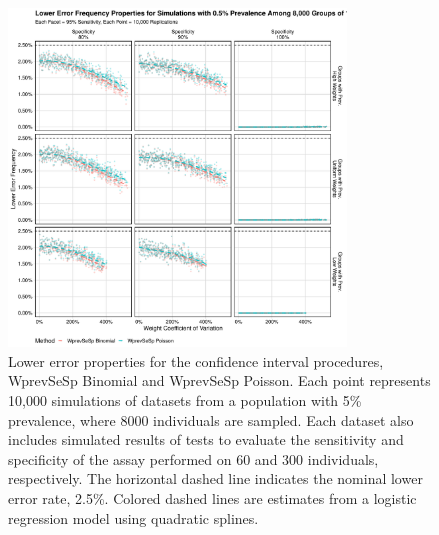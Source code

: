 \begin{figure}
\centering
\includegraphics[width=0.8\textwidth]{imperfect_lower_error_frequency_8000_groups_0_005_prev}
\caption{Lower error properties for the confidence interval procedures, WprevSeSp Binomial and WprevSeSp Poisson.
Each point represents 10,000 simulations of datasets from a population with 5\% prevalence, where 8000 individuals are sampled.
Each dataset also includes simulated results of tests to evaluate the sensitivity and specificity of the assay performed on 60 and 300 individuals, respectively.
The horizontal dashed line indicates the nominal lower error rate, 2.5\%.
Colored dashed lines are estimates from a logistic regression model using quadratic splines.}
\label{ch_3:fig:imperfect_lower_error_frequency_8000_groups_0_005_prev}
\end{figure}

